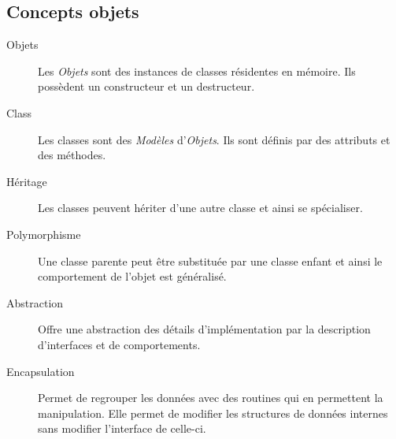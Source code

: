 \documentclass{article}
\begin{document}
\begin{multicols*}{3}
\section*{Concepts objets}
\begin{description}
\item[Objets] Les \emph{Objets} sont des instances de classes résidentes en mémoire. Ils possèdent un constructeur et un destructeur.
\item[Class] Les classes sont des \emph{Modèles} d'\emph{Objets}. Ils sont définis par des attributs et des méthodes. 
\item[Héritage] Les classes peuvent hériter d'une autre classe et ainsi se spécialiser.
\item[Polymorphisme] Une classe parente peut être substituée par une classe enfant et ainsi le comportement de l'objet est généralisé.
\item[Abstraction] Offre une abstraction des détails d'implémentation par la description d'interfaces et de comportements. 
\item[Encapsulation] Permet de regrouper les données avec des routines qui en permettent la manipulation. Elle permet de modifier les structures de données internes sans modifier l'interface de celle-ci. 
\end{description}

\end{multicols*}
\end{document}
